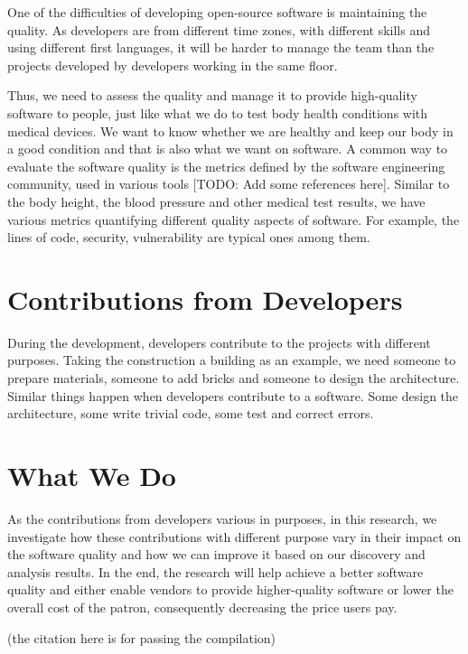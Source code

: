 \documentclass[10pt,conference]{IEEEtran}
\newcommand{\comment}[1]{{\leavevmode\color{comment}[TODO: #1]}\xspace}
\begin{document}
One of the difficulties of developing open-source software is maintaining the quality. 
As developers are from different time zones, with different skills and using different first languages, it will be harder to manage the team than the projects developed by developers working in the same floor.

Thus, we need to assess the quality and manage it to provide high-quality software to people, just like what we do to test body health conditions with medical devices.
We want to know whether we are healthy and keep our body in a good condition and that is also what we want on software.
A common way to evaluate the software quality is the metrics defined by the software engineering community, used in various tools \comment{Add some references here}.
Similar to the body height, the blood pressure and other medical test results, we have various metrics quantifying different quality aspects of software.
For example, the lines of code, security, vulnerability are typical ones among them.

\section{Contributions from Developers}

During the development, developers contribute to the projects with different purposes.
Taking the construction a building as an example, we need someone to prepare materials, someone to add bricks and someone to design the architecture.
Similar things happen when developers contribute to a software.
Some design the architecture, some write trivial code, some test and correct errors. 

\section{What We Do}

As the contributions from developers various in purposes, in this research, we investigate how these contributions with different purpose vary in their impact on the software quality and how we can improve it based on our discovery and analysis results.
In the end, the research will help achieve a better software quality and either enable vendors to provide higher-quality software or lower the overall cost of the patron, consequently decreasing the price users pay. 


(the citation here is for passing the compilation)\cite{38631e0608b54d4299d5707f3a78debf}

\medskip



\vspace{12pt}
\color{red}
\end{document}
